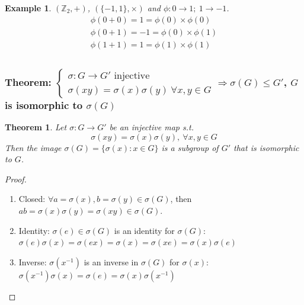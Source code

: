 \documentclass[11pt,a4paper]{article}
\newtheorem{theorem}{Theorem}
\newtheorem{example}{Example}
\begin{document}
\begin{example}
    $(\mathbb{Z}_2,+)$, $(\{-1,1\},\times)$ and $\phi: 0 \rightarrow 1;\ 1 \rightarrow -1$.
    \begin{equation}
        \begin{aligned}
            \phi(0+0)=1=\phi(0)\times\phi(0)\\
            \phi(0+1)=-1=\phi(0)\times\phi(1)\\
            \phi(1+1)=1=\phi(1)\times\phi(1)\\
        \end{aligned}
        \nonumber
    \end{equation}
\end{example}


\subsubsection{Theorem: $\left\{\begin{matrix}
    \sigma: G \rightarrow G'\text{ injective}\\
    \sigma(xy)=\sigma(x)\sigma(y)\ \forall x,y\in G
\end{matrix}\right. \Rightarrow	\sigma(G)\leq G'$, $G$ is isomorphic to $\sigma(G)$}
\begin{theorem}
Let $\sigma: G \rightarrow G'$ be an injective map s.t. $$\sigma (xy)=\sigma(x)\sigma(y),\ \forall x,y\in G$$
Then the image $\sigma(G)=\{\sigma(x):x\in G\}$ is a subgroup of $G'$ that is isomorphic to $G$.
\end{theorem}
\begin{proof}
\quad\\
\begin{enumerate}
    \item Closed: $\forall a=\sigma(x),b=\sigma(y)\in \sigma(G)$, then $ab=\sigma(x)\sigma(y)=\sigma(xy)\in \sigma(G)$.
    \item Identity: $\sigma(e)\in \sigma(G)$ is an identity for $\sigma(G)$: $\sigma(e)\sigma(x)=\sigma(ex)=\sigma(x)=\sigma(xe)=\sigma(x)\sigma(e)$
    \item Inverse: $\sigma(x^{-1})$ is an inverse in $\sigma(G)$ for $\sigma(x)$: $\sigma(x^{-1})\sigma(x)=\sigma(e)=\sigma(x)\sigma(x^{-1})$
\end{enumerate}
\end{proof}
\end{document}
